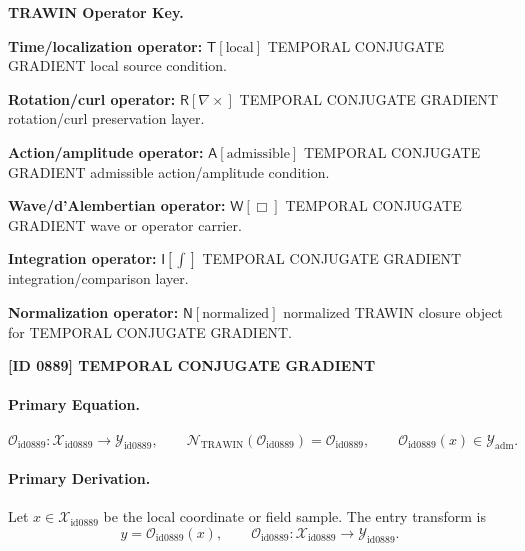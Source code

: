 \par\vspace{0.45\baselineskip}
\noindent\begin{minipage}[t]{\linewidth}
\begingroup
\small
\raggedright
\textbf{TRAWIN Operator Key.}\par
\noindent\textbf{Time/localization operator:} $\mathsf{T}\!\left[\mathrm{local}\right]$ TEMPORAL CONJUGATE GRADIENT local source condition.\par
\noindent\textbf{Rotation/curl operator:} $\mathsf{R}\!\left[\nabla\times\right]$ TEMPORAL CONJUGATE GRADIENT rotation/curl preservation layer.\par
\noindent\textbf{Action/amplitude operator:} $\mathsf{A}\!\left[\mathrm{admissible}\right]$ TEMPORAL CONJUGATE GRADIENT admissible action/amplitude condition.\par
\noindent\textbf{Wave/d'Alembertian operator:} $\mathsf{W}\!\left[\Box\right]$ TEMPORAL CONJUGATE GRADIENT wave or operator carrier.\par
\noindent\textbf{Integration operator:} $\mathsf{I}\!\left[\int\right]$ TEMPORAL CONJUGATE GRADIENT integration/comparison layer.\par
\noindent\textbf{Normalization operator:} $\mathsf{N}\!\left[\mathrm{normalized}\right]$ normalized TRAWIN closure object for TEMPORAL CONJUGATE GRADIENT.\par
\endgroup
\end{minipage}

\clearpage
\noindent\textbf{[ID 0889] TEMPORAL CONJUGATE GRADIENT}\par
\vspace{0.35em}
\paragraph{Primary Equation.}
\[
\mathcal{O}_{\mathrm{id0889}}:\mathcal{X}_{\mathrm{id0889}}\longrightarrow \mathcal{Y}_{\mathrm{id0889}},\qquad
\mathcal{N}_{\mathrm{TRAWIN}}(\mathcal{O}_{\mathrm{id0889}})=\mathcal{O}_{\mathrm{id0889}},\qquad
\mathcal{O}_{\mathrm{id0889}}(x)\in\mathcal{Y}_{\mathrm{adm}}.
\]

\paragraph{Primary Derivation.} Let $x\in \mathcal{X}_{\mathrm{id0889}}$ be the local coordinate or field sample.  The entry transform is\[
y=\mathcal{O}_{\mathrm{id0889}}(x),\qquad \mathcal{O}_{\mathrm{id0889}}:\mathcal{X}_{\mathrm{id0889}}\longrightarrow \mathcal{Y}_{\mathrm{id0889}}.
\]

